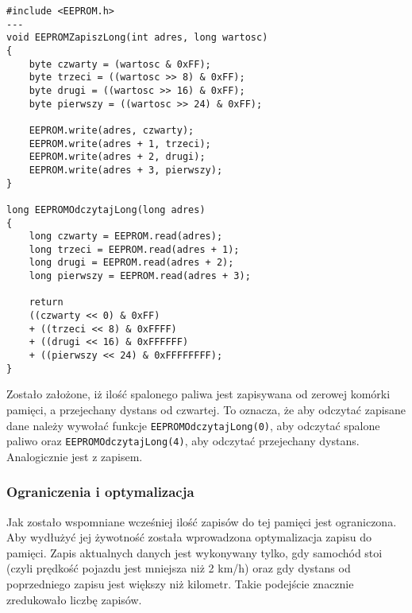 \begin{lstlisting}[label=list:eeprom_long,caption=Zapis i odczyt dużych liczb do/z EEPROM,
basicstyle=\footnotesize\ttfamily]
#include <EEPROM.h>
---
void EEPROMZapiszLong(int adres, long wartosc)
{
    byte czwarty = (wartosc & 0xFF);
    byte trzeci = ((wartosc >> 8) & 0xFF);
    byte drugi = ((wartosc >> 16) & 0xFF);
    byte pierwszy = ((wartosc >> 24) & 0xFF);
    
    EEPROM.write(adres, czwarty);
    EEPROM.write(adres + 1, trzeci);
    EEPROM.write(adres + 2, drugi);
    EEPROM.write(adres + 3, pierwszy);
}

long EEPROMOdczytajLong(long adres)
{
    long czwarty = EEPROM.read(adres);
    long trzeci = EEPROM.read(adres + 1);
    long drugi = EEPROM.read(adres + 2);
    long pierwszy = EEPROM.read(adres + 3);
    
    return 
    ((czwarty << 0) & 0xFF)
    + ((trzeci << 8) & 0xFFFF)
    + ((drugi << 16) & 0xFFFFFF) 
    + ((pierwszy << 24) & 0xFFFFFFFF);
}
\end{lstlisting}

Zostało założone, iż ilość spalonego paliwa jest zapisywana od zerowej komórki pamięci, a przejechany dystans od czwartej. To oznacza, że aby odczytać zapisane dane należy wywołać funkcje \texttt{EEPROMOdczytajLong(0)}, aby odczytać spalone paliwo oraz \texttt{EEPROMOdczytajLong(4)}, aby odczytać przejechany dystans. Analogicznie jest z zapisem.

\subsubsection{Ograniczenia i optymalizacja}

Jak zostało wspomniane wcześniej ilość zapisów do tej pamięci jest ograniczona. Aby wydłużyć jej żywotność została wprowadzona optymalizacja zapisu do pamięci. Zapis aktualnych danych jest wykonywany tylko, gdy samochód stoi (czyli prędkość pojazdu jest mniejsza niż 2 km/h) oraz gdy dystans od poprzedniego zapisu jest większy niż kilometr. Takie podejście znacznie zredukowało liczbę zapisów.